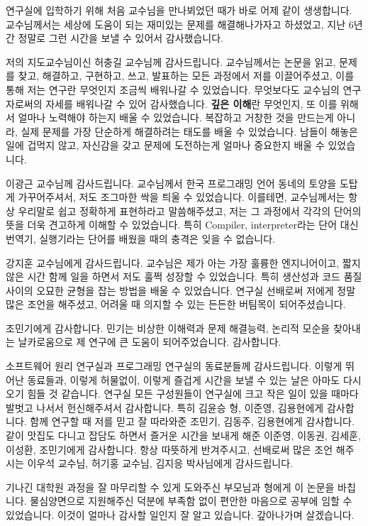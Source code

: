 \begin{acknowledgement}
  연구실에 입학하기 위해 처음 교수님을 만나뵈었던 때가 바로 어제 같이 생생합니다. 교수님께서는 세상에 도움이 되는 재미있는 문제를 해결해나가자고 하셨었고, 지난 6년간 정말로 그런 시간을 보낼 수 있어서 감사했습니다.

  저의 지도교수님이신 허충길 교수님께 감사드립니다.
  교수님께서는 논문을 읽고, 문제를 찾고, 해결하고, 구현하고, 쓰고, 발표하는 모든 과정에서 저를 이끌어주셨고, 이를 통해 저는 연구란 무엇인지 조금씩 배워나갈 수 있었습니다.
  무엇보다도 교수님의 연구자로써의 자세를 배워나갈 수 있어 감사했습니다.
  \textbf{깊은 이해}란 무엇인지, 또 이를 위해서 얼마나 노력해야 하는지 배울 수 있었습니다.
  복잡하고 거창한 것을 만드는게 아니라, 실제 문제를 가장 단순하게 해결하려는 태도를 배울 수 있었습니다.
  남들이 해놓은 일에 겁먹지 않고, 자신감을 갖고 문제에 도전하는게 얼마나 중요한지 배울 수 있었습니다.

  이광근 교수님께 감사드립니다.
  교수님께서 한국 프로그래밍 언어 동네의 토양을 도탑게 가꾸어주셔서, 저도 조그마한 싹을 틔울 수 있었습니다.
  이를테면, 교수님께서는 항상 우리말로 쉽고 정확하게 표현하라고 말씀해주셨고, 저는 그 과정에서 각각의 단어의 뜻을 더욱 견고하게 이해할 수 있었습니다.
  특히 Compiler, interpreter라는 단어 대신 번역기, 실행기라는 단어를 배웠을 때의 충격은 잊을 수 없습니다.

  강지훈 교수님에게 감사드립니다.
  교수님은 제가 아는 가장 훌륭한 엔지니어이고, 짧지 않은 시간 함께 일을 하면서 저도 훌쩍 성장할 수 있었습니다. 
  특히 생산성과 코드 품질 사이의 오묘한 균형을 잡는 방법을 배울 수 있었습니다.
  연구실 선배로써 저에게 정말 많은 조언을 해주셨고, 어려울 때 의지할 수 있는 든든한 버팀목이 되어주셨습니다.

  조민기에게 감사합니다.
  민기는 비상한 이해력과 문제 해결능력, 논리적 모순을 찾아내는 날카로움으로 제 연구에 큰 도움이 되어주었습니다.
  감사합니다.

  소프트웨어 원리 연구실과 프로그래밍 연구실의 동료분들께 감사드립니다.
  이렇게 뛰어난 동료들과, 이렇게 허물없이, 이렇게 즐겁게 시간을 보낼 수 있는 날은 아마도 다시 오기 힘들 것 같습니다.
  연구실 모든 구성원들이 연구실에 크고 작은 일이 있을 때마다 발벗고 나서서 헌신해주셔서 감사합니다. 특히 김윤승 형, 이준영, 김용현에게 감사합니다.
  함께 연구할 때 저를 믿고 잘 따라와준 조민기, 김동주, 김용현에게 감사합니다.
  같이 맛집도 다니고 잡담도 하면서 즐거운 시간을 보내게 해준 이준영, 이동권, 김세훈, 이성환, 조민기에게 감사합니다.
  항상 따뜻하게 반겨주시고, 선배로써 많은 조언 해주시는 이우석 교수님, 허기홍 교수님, 김지응 박사님에게 감사드립니다.

  기나긴 대학원 과정을 잘 마무리할 수 있게 도와주신 부모님과 형에게 이 논문을 바칩니다.
  물심양면으로 지원해주신 덕분에 부족함 없이 편안한 마음으로 공부에 임할 수 있었습니다.
  이것이 얼마나 감사할 일인지 잘 알고 있습니다. 갚아나가며 살겠습니다.


  

  
\end{acknowledgement}
